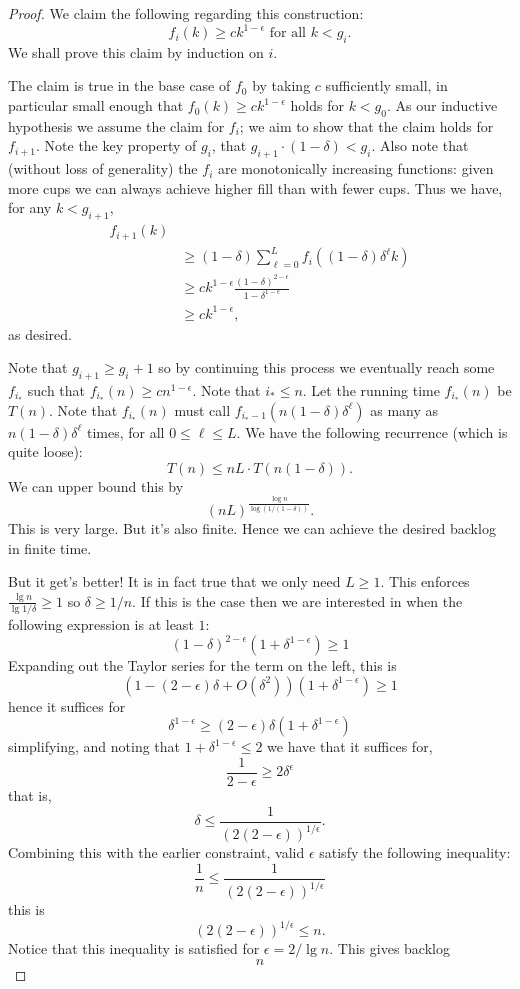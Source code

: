 \documentclass[twocolumn]{article}[11pt]
\begin{document}
\begin{proof}
  We claim the following regarding this construction:
  $$f_i(k) \ge ck^{1-\epsilon} \text{ for all } k < g_i.$$
  We shall prove this claim by induction on $i$.

  The claim is true in the base case of $f_0$ by taking $c$ sufficiently small,
  in particular small enough that $f_0(k) \ge ck^{1-\epsilon}$ holds for $k < g_0$.
  As our inductive hypothesis we assume the claim for $f_i$; we aim to show that
  the claim holds for $f_{i+1}$.
  Note the key property of $g_i$, that $g_{i+1}\cdot(1-\delta) < g_i$. Also
  note that (without loss of generality) the $f_i$ are monotonically increasing
  functions: given more cups we can always achieve higher fill than with fewer
  cups.
  Thus we have, for any $k<g_{i+1}$,
  \begin{align*}
    f_{i+1}(k) &\\
    &\ge (1-\delta)\sum_{\ell=0}^L f_i((1-\delta)\delta^\ell k)\\
    &\ge ck^{1-\epsilon}\frac{(1-\delta)^{2-\epsilon}}{1-\delta^{1-\epsilon}}\\
    &\ge ck^{1-\epsilon},
  \end{align*}
  as desired. 

  Note that $g_{i+1} \ge g_i + 1$ so by continuing this process we eventually
  reach some $f_{i_*}$ such that $f_{i_*}(n) \ge cn^{1-\epsilon}$.
  Note that $i_* \le n$.
  Let the running time $f_{i_*}(n)$ be $T(n)$.
  Note that $f_{i_*}(n)$ must call $f_{i_*-1}(n(1-\delta)\delta^\ell)$ as many
  as $n(1-\delta)\delta^\ell$ times, for all $0 \le \ell\le L$.
  We have the following recurrence (which is quite loose):
  $$T(n) \le nL \cdot T(n(1-\delta)).$$
  We can upper bound this by
  $$\left(nL\right)^{\frac{\log n}{\log (1/(1-\delta))}}.$$
  This is very large. But it's also finite. Hence we can achieve the desired backlog in finite time.

  {\color{blue}But it get's better! 
    It is in fact true that we only need $L \ge 1$. This enforces $\frac{\lg
    n}{\lg 1/\delta} \ge 1 $ so $\delta \ge 1/n$. If this is the case then we
    are interested in when the following expression is at least $1$:
    $$(1-\delta)^{2-\epsilon}(1+\delta^{1-\epsilon})\ge 1$$
    Expanding out the Taylor series for  the term on the left, this is 
    $$(1-(2-\epsilon)\delta + O(\delta^2))(1+\delta^{1-\epsilon}) \ge 1$$
    hence it suffices for 
    $$\delta^{1-\epsilon} \ge (2-\epsilon)\delta (1+\delta^{1-\epsilon})$$
    simplifying, and noting that $1+\delta^{1-\epsilon} \le 2$ we have that it suffices for,
    $$\frac{1}{2-\epsilon} \ge 2\delta^{\epsilon} $$
    that is, 
    $$\delta\le \frac{1}{(2(2-\epsilon))^{1/\epsilon}}.$$
    Combining this with the earlier constraint, valid $\epsilon $ satisfy the following inequality:
    $$\frac{1}{n}\le \frac{1}{(2(2-\epsilon))^{1/\epsilon}}$$
    this is
    $$(2(2-\epsilon))^{1/\epsilon}\le n.$$
    Notice that this inequality is satisfied for $\epsilon = 2/\lg n$.
    This gives backlog 
    $$ n $$

}
\end{proof}
\end{document}
